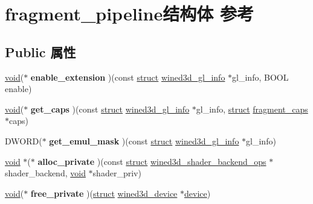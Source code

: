 \hypertarget{structfragment__pipeline}{}\section{fragment\+\_\+pipeline结构体 参考}
\label{structfragment__pipeline}
\subsection*{Public 属性}
\begin{DoxyCompactItemize}
\item 
\mbox{\label{structfragment__pipeline_aee68747b994660efe76ba43ea42d6996}} 
\hyperlink{interfacevoid}{void}($\ast$ {\bfseries enable\+\_\+extension} )(const \hyperlink{interfacestruct}{struct} \hyperlink{structwined3d__gl__info}{wined3d\+\_\+gl\+\_\+info} $\ast$gl\+\_\+info, B\+O\+OL enable)
\item 
\mbox{\label{structfragment__pipeline_af3ce40da6cef5297014a5afbe702c9c1}} 
\hyperlink{interfacevoid}{void}($\ast$ {\bfseries get\+\_\+caps} )(const \hyperlink{interfacestruct}{struct} \hyperlink{structwined3d__gl__info}{wined3d\+\_\+gl\+\_\+info} $\ast$gl\+\_\+info, \hyperlink{interfacestruct}{struct} \hyperlink{structfragment__caps}{fragment\+\_\+caps} $\ast$caps)
\item 
\mbox{\label{structfragment__pipeline_ac492579cd07473663d7a79cd9bc82114}} 
D\+W\+O\+RD($\ast$ {\bfseries get\+\_\+emul\+\_\+mask} )(const \hyperlink{interfacestruct}{struct} \hyperlink{structwined3d__gl__info}{wined3d\+\_\+gl\+\_\+info} $\ast$gl\+\_\+info)
\item 
\mbox{\label{structfragment__pipeline_a0265fe76924260c7ad7459821010e645}} 
\hyperlink{interfacevoid}{void} $\ast$($\ast$ {\bfseries alloc\+\_\+private} )(const \hyperlink{interfacestruct}{struct} \hyperlink{structwined3d__shader__backend__ops}{wined3d\+\_\+shader\+\_\+backend\+\_\+ops} $\ast$shader\+\_\+backend, \hyperlink{interfacevoid}{void} $\ast$shader\+\_\+priv)
\item 
\mbox{\label{structfragment__pipeline_ae57b43613fe55e23db65d0d5d2e06201}} 
\hyperlink{interfacevoid}{void}($\ast$ {\bfseries free\+\_\+private} )(\hyperlink{interfacestruct}{struct} \hyperlink{structwined3d__device}{wined3d\+\_\+device} $\ast$\hyperlink{structdevice}{device})

\end{DoxyCompactItemize}

